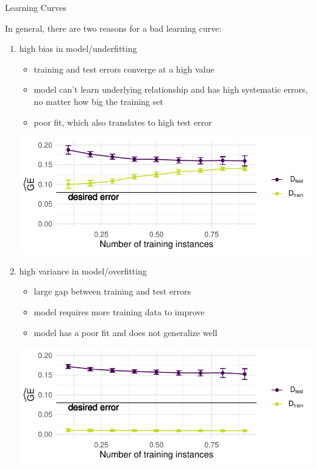 \begin{frame}[c,allowframebreaks]{Learning Curves}
    \framebreak

    In general, there are two reasons for a bad learning curve:

    \begin{enumerate}
    \item high bias in model/underfitting
    \begin{itemize}
    \item training and test errors converge at a high value
    \item model can't learn underlying relationship and has high systematic errors, no matter how big the training set
    \item poor fit, which also translates to high test error
    \end{itemize}

    \begin{center}
    \includegraphics[width=.7\textwidth]{images/learning-curve-underfitting}
    \end{center}

    \framebreak

    \item high variance in model/overfitting
    \begin{itemize}
    \item large gap between training and test errors
    \item model requires more training data to improve
    \item model has a poor fit and does not generalize well
    \end{itemize}

    \begin{center}
    \includegraphics[width=.7\textwidth]{images/learning-curve-overfitting}
    \end{center}

    \end{enumerate}
    \end{frame}


